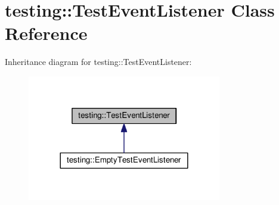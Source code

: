 \hypertarget{classtesting_1_1TestEventListener}{}\section{testing\+:\+:Test\+Event\+Listener Class Reference}
\label{classtesting_1_1TestEventListener}


Inheritance diagram for testing\+:\+:Test\+Event\+Listener\+:\nopagebreak
\begin{figure}[H]
\begin{center}
\leavevmode
\includegraphics[width=240pt]{classtesting_1_1TestEventListener__inherit__graph}
\end{center}
\end{figure}
